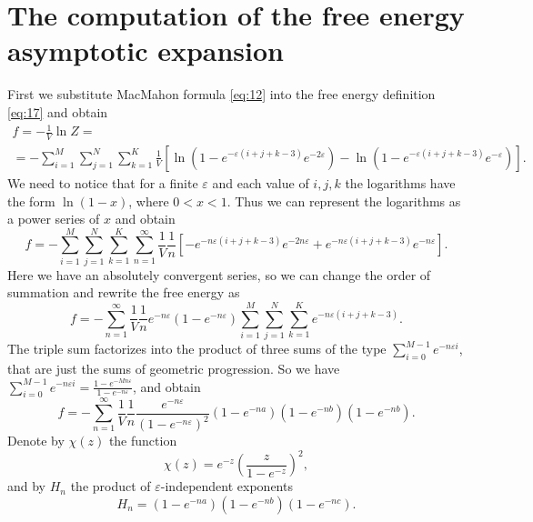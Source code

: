 \documentclass{article}
\begin{document}
\section{The computation of the free energy asymptotic expansion}
\label{sec:free-energy-scaling}
First we substitute MacMahon formula \eqref{eq:12} into the free energy definition \eqref{eq:17} and
obtain
\begin{multline}
  \label{eq:20}
    f=-\frac{1}{V}\ln Z =\\=- \sum_{i=1}^{M} \sum_{j=1}^{N} \sum_{k=1}^{K} \frac{1}{V}\left[
  \ln\left(1-e^{-\varepsilon (i+j+k-3)} e^{-2\varepsilon}\right) -\ln\left(1-e^{-\varepsilon
      (i+j+k-3)} e^{-\varepsilon}\right)\right].
\end{multline}
We need to notice that for a finite $\varepsilon$ and each value of $i,j,k$ the logarithms have the
form $\ln(1-x)$, where $0<x<1$. Thus we can represent the logarithms as a power series of $x$ and
obtain
\begin{equation}
  \label{eq:7}
  f=-\sum_{i=1}^{M} \sum_{j=1}^{N} \sum_{k=1}^{K}\sum_{n=1}^{\infty}
  \frac{1}{V}\frac{1}{n}\left[-e^{-n\varepsilon (i+j+k-3)} e^{-2n\varepsilon}+e^{-n\varepsilon
      (i+j+k-3)} e^{-n\varepsilon}\right]. 
\end{equation}
Here we have an absolutely convergent series, so we can change the order of summation and rewrite
the free energy as
\begin{equation}
  \label{eq:37}
  f=-\sum_{n=1}^{\infty}
  \frac{1}{V}\frac{1}{n}e^{-n\varepsilon}\left(1-e^{-n\varepsilon}\right)\sum_{i=1}^{M}
  \sum_{j=1}^{N} \sum_{k=1}^{K}e^{-n\varepsilon (i+j+k-3)} .
\end{equation}
The triple sum factorizes into the product of three sums of the type $\sum_{i=0}^{M-1}e^{-n\varepsilon
  i}$, that are just the
 sums of geometric progression. So we have $\sum_{i=0}^{M-1}e^{-n\varepsilon
  i}=\frac{1-e^{-Mn\varepsilon}}{1-e^{-n\varepsilon}}$, and obtain
\begin{equation}
  \label{eq:38}
  f=-\sum_{n=1}^{\infty}
  \frac{1}{V}\frac{1}{n}\frac{e^{-n\varepsilon}}{\left(1-e^{-n\varepsilon}\right)^{2}}
  \left(1-e^{-na}\right)\left(1-e^{-nb}\right)\left(1-e^{-nb}\right).
\end{equation}
Denote by $\chi(z)$ the function
\begin{equation}
  \label{eq:39}
  \chi(z)=e^{-z}\left(\frac{z}{1-e^{-z}}\right)^{2}, 
\end{equation}
and by $H_{n}$ the product of $\varepsilon$-independent exponents
\begin{equation}
  \label{eq:40}
  H_{n}=\left(1-e^{-na}\right)\left(1-e^{-nb}\right)\left(1-e^{-nc}\right).
\end{equation}
\end{document}
